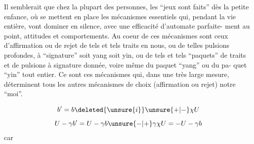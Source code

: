 Il semblerait que chez la plupart des personnes, les ``jeux sont faits'' dès
la petite enfance, où se mettent en place les mécanismes essentiels qui, pendant
la vie entière, vont dominer en silence, avec une efficacité d'automate parfaite-\newline
ment au point, attitudes et comportements. Au coeur de ces mécanismes sont ceux
d'affirmation ou de rejet de tels et tels traits en nous, ou de telles pulsions
profondes, à ``signature'' soit yang soit yin, ou de tels et tels ``paquets'' de
traits et de pulsions à signature donnée, voire même du paquet ``yang'' ou du pa-\newline
quet ``yin'' tout entier. Ce sont ces mécanismes qui, dans une très large mesure,
déterminent tous les autres mécanismes de choix (affirmation ou rejet) 
notre ``moi''.

\[
 b'=b\deleted{\unsure{i}}\unsure{+|-}\chi U
\]
\[
 U-\gamma b'=U-\gamma b\unsure{-|+}\gamma\chi U=-U-\gamma b
\]
car


